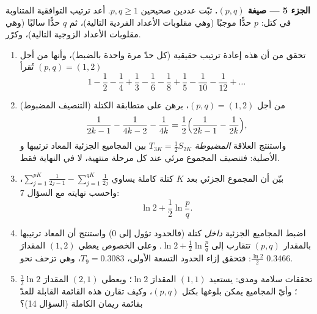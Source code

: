 \begin{problem}[{مسألة نهاية الأسبوع --- $H_n = \ln n + \gamma +
\frac{1}{2n} + O(n^{-2})$، وإعادة ترتيب $1 - \frac12 +
\frac13 - \dots$ إلى $\frac{\ln 2}{2}$}]
\medskip
\noindent\textbf{الجزء 5 --- صيغة $(p, q)$.} ثبّت عددين صحيحين
$p, q \geq 1$. أعد ترتيب  التوافقية المتناوبة في
كتل: $p$ حدًّا موجبًا (وهي مقلوبات الأعداد الفردية التالية)، ثم $q$
حدًّا سالبًا (وهي مقلوبات الأعداد الزوجية التالية)، وكرّر.
\begin{enumerate}[resume]
  \item تحقق من أن هذه إعادة ترتيب حقيقية (كل حدّ
        مرة واحدة بالضبط)، وأنها من أجل $(p, q) = (1, 2)$ تُقرأ
        \[
        1 - \frac12 - \frac14 + \frac13 - \frac16 - \frac18 +
        \frac15 - \frac1{10} - \frac1{12} + \dots
        \]
  \item (التنصيف المضبوط) من أجل $(p, q) = (1, 2)$، برهن على
        متطابقة الكتلة
        \[
        \frac{1}{2k-1} - \frac{1}{4k-2} - \frac{1}{4k}
        = \frac12\Bigl(\frac{1}{2k-1} - \frac{1}{2k}\Bigr),
        \]
        واستنتج العلاقة \emph{المضبوطة} $T_{3K} = \frac12
        S_{2K}$ بين المجاميع الجزئية المعاد ترتيبها و
        الأصلية: فتنصيف المجموع مرئي عند
        كل مرحلة منتهية، لا في النهاية فقط.
  \item بيّن أن المجموع الجزئي بعد $K$ كتلة كاملة
        يساوي $\sum_{j=1}^{pK} \frac{1}{2j-1} -
        \sum_{j=1}^{qK} \frac{1}{2j}$، واحسب نهايته
        مع السؤال 7:
        \[
        \ln 2 + \frac12 \ln\frac pq .
        \]
  \item اضبط المجاميع الجزئية \emph{داخل} كتلة (فالحدود تؤول إلى $0$)
        واستنتج أن  المعاد ترتيبها بالمقدار $(p,
        q)$ تتقارب إلى $\ln 2 + \frac12\ln
        \frac pq$. وعلى الخصوص يعطي $(1, 2)$ المقدارَ $\frac{\ln
        2}{2}$: فتحقق إزاء الحدود التسعة الأولى، $T_9 =
        0.3083$، وهي تزحف نحو $0.3466$.
  \item تحققات سلامة ومدى: يستعيد $(1,1)$ المقدارَ $\ln 2$؛
        ويعطي $(2,1)$ المقدارَ $\frac32\ln 2$؛ وأيّ المجاميع يمكن بلوغها
        بكتل $(p, q)$، وكيف تقارن هذه القائمة القابلة للعدّ
        بقائمة ريمان الكاملة (السؤال 14)؟
\end{enumerate}


\end{problem}
